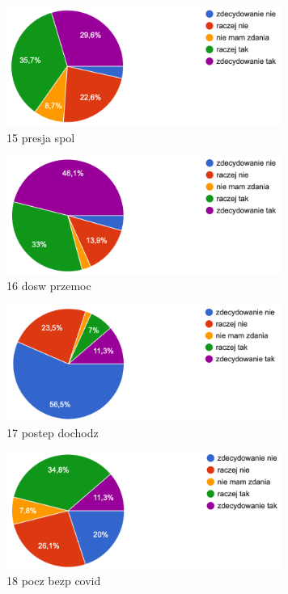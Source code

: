 \documentclass[a4paper,12pt,twoside,openany]{report}
\begin{document}
\begin{figure}
    \includegraphics[width=9cm]{wyniki/15_presja_spol}
    \caption{ 15 presja spol }
\end{figure}

\begin{figure}
    \includegraphics[width=9cm]{wyniki/16_dosw_przemoc}
    \caption{ 16 dosw przemoc }
\end{figure}

\begin{figure}
    \includegraphics[width=9cm]{wyniki/17_postep_dochodz}
    \caption{ 17 postep dochodz }
\end{figure}

\begin{figure}
    \includegraphics[width=9cm]{wyniki/18_pocz_bezp_covid}
    \caption{ 18 pocz bezp covid }
\end{figure}
\end{document}
